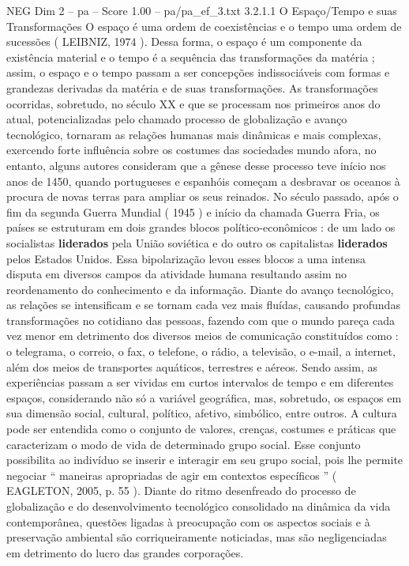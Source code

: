 \begin{textsample}{NEG Dim 2 – pa – Score 1.00 – pa/pa\_ef\_3.txt}  \label{ex:f2_neg_227}
3.2.1.1 O Espaço/Tempo e suas Transformações O espaço é uma ordem de coexistências e o tempo uma ordem de sucessões ( LEIBNIZ, 1974 ).
Dessa forma, o espaço é um componente da existência material e o tempo é a sequência das transformações da matéria ; assim, o espaço e o tempo passam a ser concepções indissociáveis com formas e grandezas derivadas da matéria e de suas transformações.
As transformações ocorridas, sobretudo, no século XX e que se processam nos primeiros anos do atual, potencializadas pelo chamado processo de globalização e avanço tecnológico, tornaram as relações humanas mais dinâmicas e mais complexas, exercendo forte influência sobre os costumes das sociedades mundo afora, no entanto, alguns autores consideram que a gênese desse processo teve início nos anos de 1450, quando portugueses e espanhóis começam a desbravar os oceanos à procura de novas terras para ampliar os seus reinados.
No século passado, após o fim da segunda Guerra Mundial ( 1945 ) e início da chamada Guerra Fria, os países se estruturam em dois grandes blocos político-econômicos : de um lado os socialistas \textbf{liderados} pela União soviética e do outro os capitalistas \textbf{liderados} pelos Estados Unidos.
Essa bipolarização levou esses blocos a uma intensa disputa em diversos campos da atividade humana resultando assim no reordenamento do conhecimento e da informação.
Diante do avanço tecnológico, as relações se intensificam e se tornam cada vez mais fluídas, causando profundas transformações no cotidiano das pessoas, fazendo com que o mundo pareça cada vez menor em detrimento dos diversos meios de comunicação constituídos como : o telegrama, o correio, o fax, o telefone, o rádio, a televisão, o e-mail, a internet, além dos meios de transportes aquáticos, terrestres e aéreos.
Sendo assim, as experiências passam a ser vividas em curtos intervalos de tempo e em diferentes espaços, considerando não só a variável geográfica, mas, sobretudo, os espaços em sua dimensão social, cultural, político, afetivo, simbólico, entre outros.
A cultura pode ser entendida como o conjunto de valores, crenças, costumes e práticas que caracterizam o modo de vida de determinado grupo social.
Esse conjunto possibilita ao indivíduo se inserir e interagir em seu grupo social, pois lhe permite negociar “ maneiras apropriadas de agir em contextos específicos ” ( EAGLETON, 2005, p. 55 ).
Diante do ritmo desenfreado do processo de globalização e do desenvolvimento tecnológico consolidado na dinâmica da vida contemporânea, questões ligadas à preocupação com os aspectos sociais e à preservação ambiental são corriqueiramente noticiadas, mas são negligenciadas em detrimento do lucro das grandes corporações.

\end{textsample}
